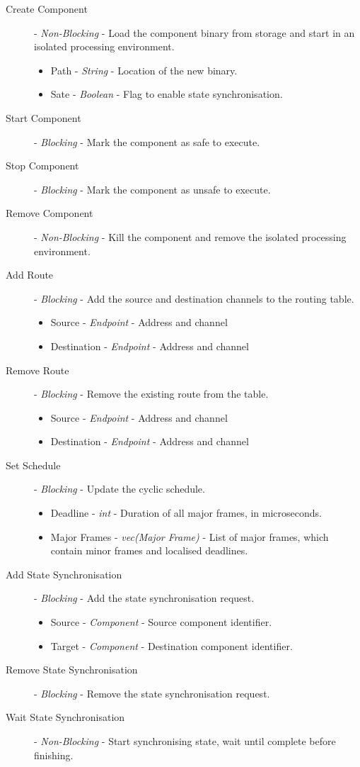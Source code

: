 \begin{description}
    \item [Create Component] - \textit{Non-Blocking} - Load the component binary from storage and start in an isolated processing environment.
    \begin{itemize}
        \item Path - \textit{String} - Location of the new binary.
        \item Sate - \textit{Boolean} - Flag to enable state synchronisation.
    \end{itemize}
    \item [Start Component] - \textit{Blocking} - Mark the component as safe to execute.
    \item [Stop Component] - \textit{Blocking} - Mark the component as unsafe to execute.
    \item [Remove Component] - \textit{Non-Blocking} - Kill the component and remove the isolated processing environment.
    \item [Add Route] - \textit{Blocking} - Add the source and destination channels to the routing table.
    \begin{itemize}
        \item Source - \textit{Endpoint} - Address and channel
        \item Destination - \textit{Endpoint} - Address and channel
    \end{itemize}
    \item [Remove Route] - \textit{Blocking} - Remove the existing route from the table.
    \begin{itemize}
        \item Source - \textit{Endpoint} - Address and channel
        \item Destination - \textit{Endpoint} - Address and channel
    \end{itemize}
    \item [Set Schedule] - \textit{Blocking} - Update the cyclic schedule.
    \begin{itemize}
        \item Deadline - \textit{int} - Duration of all major frames, in microseconds.
        \item Major Frames - \textit{vec(Major Frame)} - List of major frames, which contain minor frames and localised deadlines.
    \end{itemize}
    \item [Add State Synchronisation] - \textit{Blocking} - Add the state synchronisation request.
    \begin{itemize}
        \item Source - \textit{Component} - Source component identifier.
        \item Target - \textit{Component} - Destination component identifier.
    \end{itemize}
    \item [Remove State Synchronisation] - \textit{Blocking} - Remove the state synchronisation request.
    \item [Wait State Synchronisation] - \textit{Non-Blocking} - Start synchronising state, wait until complete before finishing.
\end{description}
